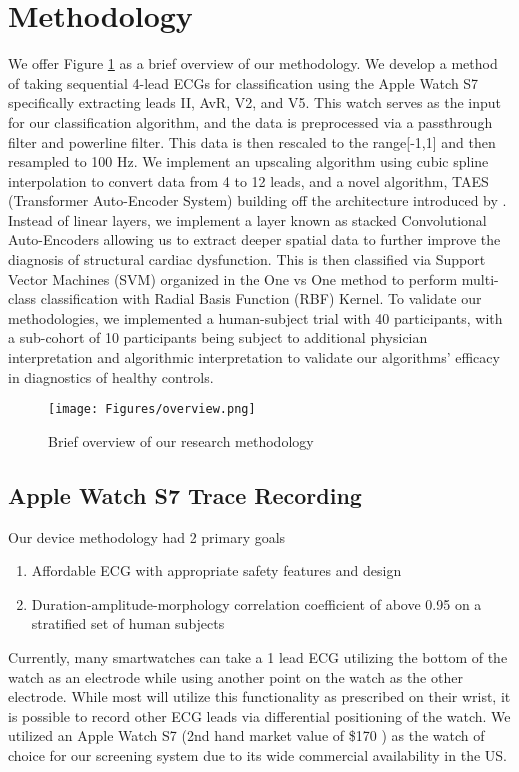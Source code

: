 \documentclass[
	a4paper, 
	10pt, 
	twoside, 
]{LTJournalArticle}
\begin{document}
\section{Methodology}
We offer Figure \ref{fig:overview} as a brief overview of our methodology. We develop a method of taking sequential 4-lead ECGs for classification using the Apple Watch S7 specifically extracting leads II, AvR, V2, and V5. This watch serves as the input for our classification algorithm, and the data is preprocessed via a passthrough filter and powerline filter. This data is then rescaled to the range[-1,1] and then resampled to 100 Hz. We implement an upscaling algorithm using cubic spline interpolation to convert data from 4 to 12 leads, and a novel algorithm, TAES (Transformer Auto-Encoder System) building off the architecture introduced by \textcite{Ding2023}. Instead of linear layers, we implement a layer known as stacked Convolutional Auto-Encoders allowing us to extract deeper spatial data to further improve the diagnosis of structural cardiac dysfunction. This is then classified via Support Vector Machines (SVM) organized in the One vs One method to perform multi-class classification with Radial Basis Function (RBF) Kernel. To validate our methodologies, we implemented a human-subject trial with 40 participants, with a sub-cohort of 10 participants being subject to additional physician interpretation and algorithmic interpretation to validate our algorithms' efficacy in diagnostics of healthy controls. 
\begin{figure}[!h]
    \centering
    \texttt{[image: Figures/overview.png]}
    \caption{Brief overview of our research methodology}
    \label{fig:overview}
\end{figure}
\subsection{Apple Watch S7 Trace Recording}
Our device methodology had 2 primary goals
\begin{enumerate}
	\item Affordable ECG with appropriate safety features and design
	\item Duration-amplitude-morphology correlation coefficient of above 0.95 on a stratified set of human subjects
\end{enumerate}
Currently, many smartwatches can take a 1 lead ECG utilizing the bottom of the watch as an electrode while using another point on the watch as the other electrode. While most will utilize this functionality as prescribed on their wrist, it is possible to record other ECG leads via differential positioning of the watch. We utilized an Apple Watch S7 (2nd hand market value of \$170 \cite{Turner_2024}) as the watch of choice for our screening system due to its wide commercial availability in the US. 
\end{document}
